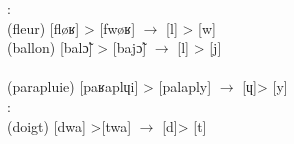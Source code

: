 \documentclass[output=paper,newtxmath,modfonts,nonflat,draftmode]{langsci/langscibook}
\begin{document}
\ex{}:\\
(fleur) [fløʁ] > [fwøʁ] $\rightarrow$ [l] > [w]\\ 
(ballon) [balɔ̃] > [bajɔ̃] $\rightarrow$ [l] > [j]\\

\ex{}\\
(parapluie) [paʁaplɥi] > [palaply] $\rightarrow$ [ɥ]> [y]\\

\ex{}:\\
(doigt) [dwa] >[twa] $\rightarrow$ [d]> [t]\\
\z
\z


\end{document}
